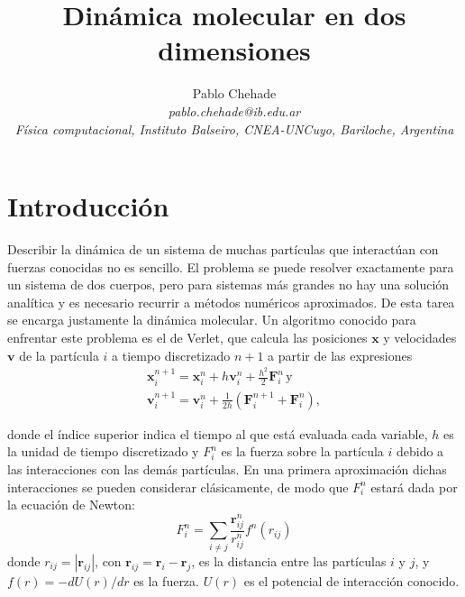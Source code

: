 \documentclass[aps,prb,twocolumn,superscriptaddress,floatfix,longbibliography]{revtex4-2}
\newif\ifptitle
\newif\ifpnumber
\newcounter{para}
\newcommand\ptitle[1]{\par\refstepcounter{para}
{\ifpnumber{\noindent\textcolor{lightgray}{\textbf{\thepara}}\indent}\fi}
{\ifptitle{\textbf{[{#1}]}}\fi}}
\begin{document}
\newcommand{\mytitle}{Dinámica molecular en dos dimensiones}

\title{\mytitle}

\author{Pablo Chehade \\
    \small \textit{pablo.chehade@ib.edu.ar} \\
    \small \textit{Física computacional, Instituto Balseiro, CNEA-UNCuyo, Bariloche, Argentina} \\}



\maketitle

\section{Introducción}

\ptitle{Dinámica molecular a rasgos generales}

Describir la dinámica de un sistema de muchas partículas que interactúan con fuerzas conocidas no es sencillo. El problema se puede resolver exactamente para un sistema de dos cuerpos, pero para sistemas más grandes no hay una solución analítica y es necesario recurrir a métodos numéricos aproximados. De esta tarea se encarga justamente la dinámica molecular. Un algoritmo conocido para enfrentar este problema es el de Verlet, que calcula las posiciones $\mathbf{x}$ y velocidades $\mathbf{v}$ de la partícula $i$ a tiempo discretizado $n+1$ a partir de las expresiones
\begin{equation}
\begin{split}
\mathbf{x}^{n+1}_i = \mathbf{x}^n_i + h \mathbf{v}^n_i + \frac{h^2}{2}\mathbf{F}^n_i  \, \mathrm{y} \\
\mathbf{v}^{n+1}_i = \mathbf{v}^n_i + \frac{1}{2h}(\mathbf{F}^{n+1}_i + \mathbf{F}^n_i),
\end{split}
\label{eq:Verlet}
\end{equation}

donde el índice superior indica el tiempo al que está evaluada cada variable, $h$ es la unidad de tiempo discretizado y $F^n_i$ es la fuerza sobre la partícula $i$ debido a las interacciones con las demás partículas. En una primera aproximación dichas interacciones se pueden considerar clásicamente, de modo que $F^n_i$ estará dada por la ecuación de Newton:
\begin{equation}
F^n_i = \sum_{i \neq j} \frac{\mathbf{r}^n_{ij}}{r^n_{ij}} f^n(r_{ij})
\label{eq:Newton}
\end{equation}
donde $r_{ij} = |\mathbf{r}_{ij}|$, con $\mathbf{r}_{ij} = \mathbf{r}_i - \mathbf{r}_j$, es la distancia entre las partículas $i$ y $j$, y $f(r) = -d U(r)/dr$ es la fuerza. $U(r)$ es el potencial de interacción conocido.
\end{document}
